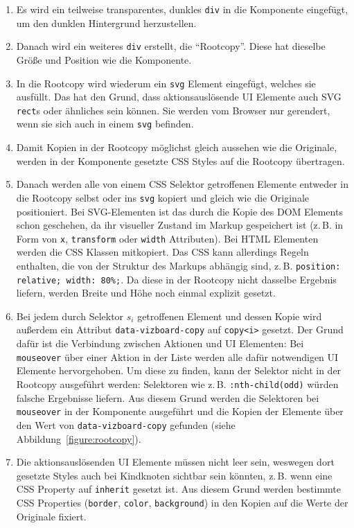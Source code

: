 \documentclass[
	headsepline,
	footsepline,
	fontsize=12pt,
	bibliography=totoc
]{scrbook}
\begin{document}
\begin{enumerate}
	\item Es wird ein teilweise transparentes, dunkles \texttt{div} in die Komponente eingefügt, um den dunklen Hintergrund herzustellen.
	\item Danach wird ein weiteres \texttt{div} erstellt, die \enquote{Rootcopy}. Diese hat dieselbe Größe und Position wie die Komponente.
	\item In die Rootcopy wird wiederum ein \texttt{svg} Element eingefügt, welches sie ausfüllt. Das hat den Grund, dass aktionsauslösende UI Elemente auch SVG \texttt{rect}s oder ähnliches sein können. Sie werden vom Browser nur gerendert, wenn sie sich auch in einem \texttt{svg} befinden.
	\item Damit Kopien in der Rootcopy möglichst gleich aussehen wie die Originale, werden in der Komponente gesetzte CSS Styles auf die Rootcopy übertragen.
	\item Danach werden alle von einem CSS Selektor getroffenen Elemente entweder in die Rootcopy selbst oder ins \texttt{svg} kopiert und gleich wie die Originale positioniert. Bei SVG-Elementen ist das durch die Kopie des DOM Elements schon geschehen, da ihr visueller Zustand im Markup gespeichert ist (z.\,B. in Form von \texttt{x}, \texttt{transform} oder \texttt{width} Attributen). Bei HTML Elementen werden die CSS Klassen mitkopiert. Das CSS kann allerdings Regeln enthalten, die von der Struktur des Markups abhängig sind, z.\,B. \texttt{position: relative; width: 80\%;}. Da diese in der Rootcopy nicht dasselbe Ergebnis liefern, werden Breite und Höhe noch einmal explizit gesetzt.
	\item Bei jedem durch Selektor $s_i$ getroffenen Element und dessen Kopie wird außerdem ein Attribut \texttt{data-vizboard-copy} auf \texttt{copy<i>} gesetzt. Der Grund dafür ist die Verbindung zwischen Aktionen und UI Elementen: Bei \texttt{mouseover} über einer Aktion in der Liste werden alle dafür notwendigen UI Elemente hervorgehoben. Um diese zu finden, kann der Selektor nicht in der Rootcopy ausgeführt werden: Selektoren wie z.\,B. \texttt{:nth-child(odd)} würden falsche Ergebnisse liefern. Aus diesem Grund werden die Selektoren bei \texttt{mouseover} in der Komponente ausgeführt und die Kopien der Elemente über den Wert von \texttt{data-vizboard-copy} gefunden (siehe Abbildung~\ref{figure:rootcopy}).
	\item Die aktionsauslösenden UI Elemente müssen nicht leer sein, weswegen dort gesetzte Styles auch bei Kindknoten sichtbar sein könnten, z.\,B. wenn eine CSS Property auf \texttt{inherit} gesetzt ist. Aus diesem Grund werden bestimmte CSS Properties (\texttt{border}, \texttt{color}, \texttt{background}) in den Kopien auf die Werte der Originale fixiert.

\end{enumerate}
\end{document}
